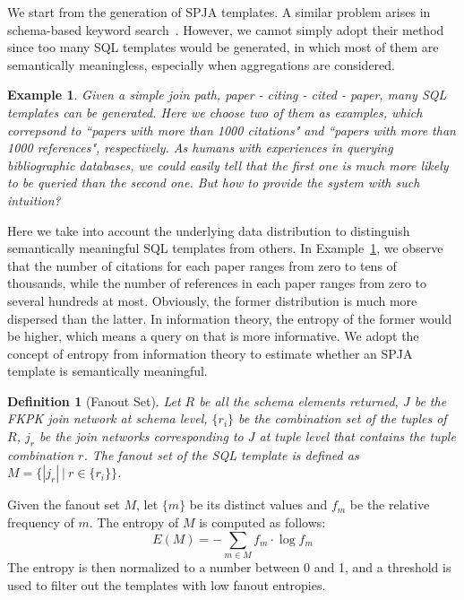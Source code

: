 \documentclass{vldb}
\newtheorem{example}{Example}
\newtheorem{definition}{Definition}
\begin{document}
We start from the generation of SPJA templates.  A similar problem arises in schema-based keyword search~\cite{DBLP:conf/vldb/HristidisP02,DBLP:conf/sigmod/MarkowetzYP07,DBLP:conf/icde/FanLZ11,Li:2014:SS:2588555.2588571}.  However, we cannot simply adopt their method since too many SQL templates would be generated, in which most of them are semantically meaningless, especially when aggregations are considered.  
\begin{example}
\label{example:distribution}
Given a simple join path, paper - citing - cited - paper, many SQL templates can be generated.  Here we choose two of them as examples, which correpsond to ``papers with more than 1000 citations" and ``papers with more than 1000 references", respectively.  As humans with experiences in querying bibliographic databases, we could easily tell that the first one is much more likely to be queried than the second one.  But how to provide the system with such intuition? 
\end{example}

Here we take into account the underlying data distribution to distinguish semantically meaningful SQL templates from others.  In Example~\ref{example:distribution}, we observe that the number of citations for each paper ranges from zero to tens of thousands, while the number of references in each paper ranges from zero to several hundreds at most.  Obviously, the former distribution is much more dispersed than the latter.   In information theory, the entropy of the former would be higher, which means a query on that is more informative.  We adopt the concept of entropy from information theory to estimate whether an SPJA template is semantically meaningful.
\begin{definition}[Fanout Set]
Let $R$ be all the schema elements returned, $J$ be the FKPK join network at schema level, $\{r_{i}\}$ be the combination set of the tuples of $R$, $j_r$ be the join networks corresponding to $J$ at tuple level that contains the tuple combination $r$.  The fanout set of the SQL template is defined as $M = \{|j_r|\ |\ r\in\{r_i\}\}$.  
\end{definition}

Given the fanout set $M$, let $\{m\}$ be its distinct values and $f_m$ be the relative frequency of $m$.  The entropy of $M$ is computed as follows: 
\begin{equation}
E(M) = -\sum_{m \in M}  f_m \cdot \log f_m
\end{equation}
The entropy is then normalized to a number between 0 and 1, and a threshold is used to filter out the templates with low fanout entropies.  
\end{document}
